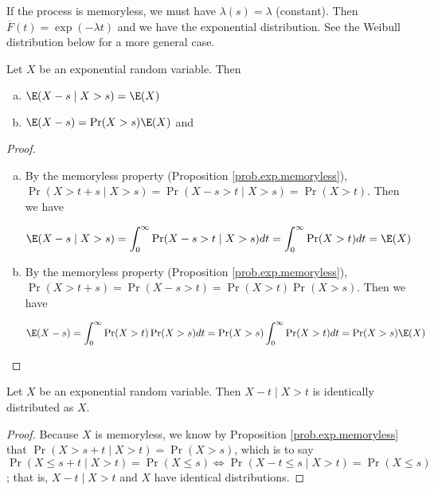 \begin{itemize}
\begin{remark}
If the process is memoryless, we must have \(\lambda(s) = \lambda\) (constant). Then \(\overline{F}(t) = \exp(-\lambda t)\) and we have the exponential distribution. See the Weibull distribution below for a more general case.

\end{remark}

\begin{proposition} Let \(X\) be an exponential random variable. Then 

\begin{enumerate}[(a)]

\item  \(\E(X - s \mid X > s) = \E(X)\) 

\item \(\E(X - s ) = \Pr (X > s) \E(X)\) and



\end{enumerate}

\end{proposition}

\begin{proof} \begin{enumerate}[(a)]

\item By the memoryless property (Proposition \ref{prob.exp.memoryless}), \( \Pr(X > t + s \mid X > s) =  \Pr(X - s > t  \mid X > s) = \Pr(X > t) \). Then we have

\[
\E(X - s \mid X > s) = \int_0^\infty \Pr(X - s > t  \mid X > s) dt = \int_0^\infty \Pr(X > t)  dt = \E(X)
\]

\item By the memoryless property (Proposition \ref{prob.exp.memoryless}), \( \Pr(X > t + s ) =  \Pr(X - s > t ) = \Pr(X > t) \Pr( X > s) \). Then we have

\[
\E(X - s ) = \int_0^\infty \Pr(X > t) \Pr( X > s)  dt = \Pr( X > s) \int_0^\infty \Pr(X > t)   dt = \Pr (X > s) \E(X)
\]

\end{enumerate}
\end{proof}

\begin{proposition}\label{prob.exp.id.dist} Let \(X\) be an exponential random variable. Then \(X - t \mid X > t\) is identically distributed as \(X\).

\end{proposition}

\begin{proof} Because \(X\) is memoryless, we know by Proposition \ref{prob.exp.memoryless} that \(\Pr(X > s+t \mid X > t) = \Pr(X > s)\), which is to say \(\Pr(X \leq s + t \mid X > t) = \Pr(X \leq s) \iff \Pr(X- t \leq s  \mid X > t) = \Pr(X \leq s)  \); that is, \(X - t \mid X > t\) and \(X\) have identical distributions. 


\end{proof}
\end{itemize}
